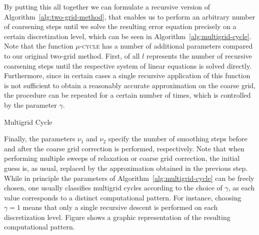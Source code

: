 By putting this all together we can formulate a recursive version of Algorithm~\ref{alg:two-grid-method}, that enables us to perform an arbitrary number of coarsening steps until we solve the resulting error equation precisely on a certain discretization level, which can be seen in Algorithm~\ref{alg:multigrid-cycle}.
Note that the function \textsc{$\mu$-cycle} has a number of additional parameters compared to our original two-grid method.
First, of all $l$ represents the number of recursive coarsening steps until the respective system of linear equations is solved directly.
Furthermore, since in certain cases a single recursive application of this function is not sufficient to obtain a reasonably accurate approximation on the coarse grid, the procedure can be repeated for a certain number of times, which is controlled by the parameter $\gamma$.
\begin{algorithm}
	\caption{Multigrid Cycle}
	\label{alg:multigrid-cycle}
	\begin{algorithmic}
		\EndFor
		\Else
		\EndFor
		\EndIf
		\EndFor
		\State {}
		\EndFunction
	\end{algorithmic}
\end{algorithm}
Finally, the parameters $\nu_1$ and $\nu_2$ specify the number of smoothing steps before and after the coarse grid correction is performed, respectively.
Note that when performing multiple sweeps of relaxation or coarse grid correction, the initial guess is, as usual, replaced by the approximation obtained in the previous step.
While in principle the parameters of Algorithm~\ref{alg:multigrid-cycle} can be freely chosen, one usually classifies multigrid cycles according to the choice of $\gamma$, as each value corresponds to a distinct computational pattern.
For instance, choosing $\gamma = 1$ means that only a single recursive descent is performed on each discretization level.
Figure shows a graphic representation of the resulting computational pattern.

